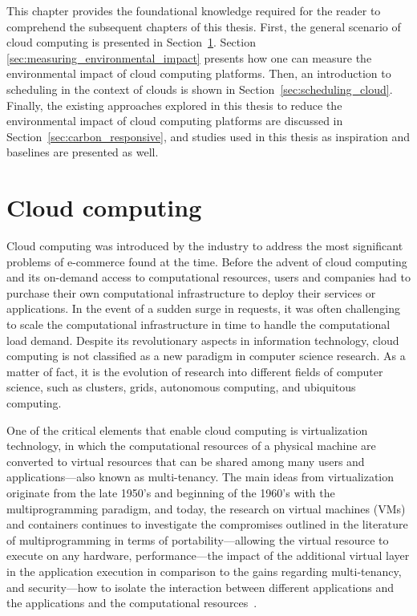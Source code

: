 This chapter provides the foundational knowledge required for the reader to comprehend the subsequent chapters of this thesis. First, the general scenario of cloud computing is presented in Section~\ref{sec:cloud}. Section \ref{sec:measuring_environmental_impact} presents how one can measure the environmental impact of cloud computing platforms. Then, an introduction to scheduling in the context of clouds is shown in Section~\ref{sec:scheduling_cloud}.  Finally, the existing approaches explored in this thesis to reduce the environmental impact of cloud computing platforms are discussed in Section~\ref{sec:carbon_responsive}, and studies used in this thesis as inspiration and baselines are presented as well.

\section{Cloud computing}

\label{sec:cloud}

Cloud computing was introduced by the industry to address the most significant problems of e-commerce found at the time. Before the advent of cloud computing and its on-demand access to computational resources, users and companies had to purchase their own computational infrastructure to deploy their services or applications. In the event of a sudden surge in requests, it was often challenging to scale the computational infrastructure in time to handle the computational load demand. Despite its revolutionary aspects in information technology, cloud computing is not classified as a new paradigm in computer science research. As a matter of fact, it is the evolution of research into different fields of computer science, such as clusters, grids, autonomous computing, and ubiquitous computing.


One of the critical elements that enable cloud computing is virtualization technology, in which the computational resources of a physical machine are converted to virtual resources that can be shared among many users and applications---also known as multi-tenancy.  The main ideas from virtualization originate from the late 1950's and beginning of the 1960's with the multiprogramming paradigm, and today, the research on virtual machines (VMs) and containers continues to investigate the compromises outlined in the literature of multiprogramming in terms of portability---allowing the virtual resource to execute on any hardware,  performance---the impact of the additional virtual layer in the application execution in comparison to the gains regarding multi-tenancy, and security---how to isolate the interaction between different applications and the applications and the computational resources~\cite{randall2020_virtualization}.



